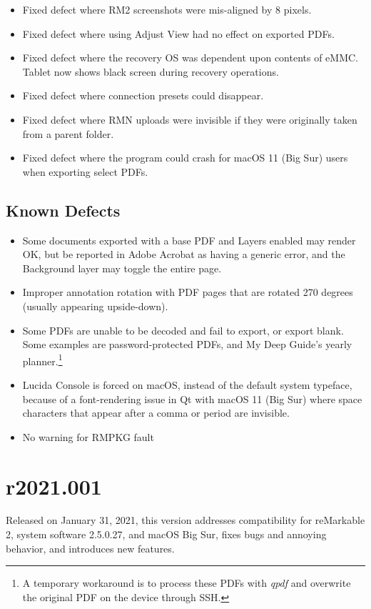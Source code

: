 \documentclass{memoir}
\begin{document}
{{\begin{itemize}
  \item{Fixed defect where RM2 screenshots were mis-aligned by 8 pixels.}
  \item{Fixed defect where using Adjust View had no effect on exported PDFs.}
  \item{Fixed defect where the recovery OS was dependent upon contents of eMMC. Tablet now shows black screen during recovery operations.}
  \item{Fixed defect where connection presets could disappear.}
  \item{Fixed defect where RMN uploads were invisible if they were originally taken from a parent folder.}
    \item{Fixed defect where the program could crash for macOS 11 (Big Sur) users when exporting select PDFs.}
    

\end{itemize}

\subsection{Known Defects}
\begin{itemize}
\item{Some documents exported with a base PDF and Layers enabled may render OK, but be reported in Adobe Acrobat as having a generic error, and the Background layer may toggle the entire page.}
\item{Improper annotation rotation with PDF pages that are rotated 270 degrees (usually appearing upside-down).}
\item{Some PDFs are unable to be decoded and fail to export, or export blank. Some examples are password-protected PDFs, and My Deep Guide's yearly planner.\footnote{A temporary workaround is to process these PDFs with \textit{qpdf} and overwrite the original PDF on the device through SSH.}}
  \item{Lucida Console is forced on macOS, instead of the default system typeface, because of a font-rendering issue in Qt with macOS 11 (Big Sur) where space characters that appear after a comma or period are invisible.}
  \item{No warning for RMPKG fault}
\end{itemize}






\newpage
\section{r2021.001}
\label{sec:r2021.001}
Released on January 31, 2021, this version addresses compatibility for reMarkable 2, system software 2.5.0.27, and macOS Big Sur, fixes bugs and annoying behavior, and introduces new features.

}}
\end{document}
